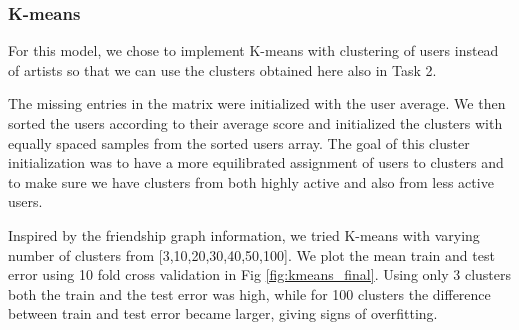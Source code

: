 \subsubsection{K-means}
For this model, we chose to implement K-means with clustering of users instead of artists so that we can use the clusters obtained here also in Task 2.

The missing entries in the matrix were initialized with the user average. We then sorted the users according to their average score and initialized the clusters with equally spaced samples from the sorted users array. The goal of this cluster initialization was to have a more equilibrated assignment of users to clusters and to make sure we have clusters from both highly active and also from less active users.

Inspired by the friendship graph information, we tried K-means with varying number of clusters from [3,10,20,30,40,50,100]. We plot the mean train and test error using 10 fold cross validation in Fig \ref{fig:kmeans_final}. Using only 3 clusters both the train and the test error was high, while for 100 clusters the difference between train and test error became larger, giving signs of overfitting.




